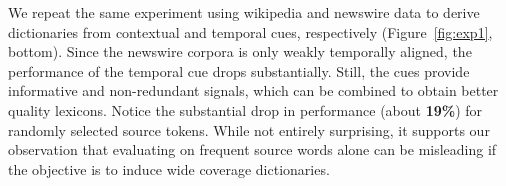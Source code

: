 \documentclass{article}
\newcommand{\figref}[1]{Figure~\ref{#1}}
\begin{document}
We repeat the same experiment using wikipedia and newswire data to derive dictionaries from contextual and temporal cues, respectively (\figref{fig:exp1}, bottom).  Since the newswire corpora is only weakly temporally aligned, the performance of the temporal cue drops substantially.  Still, the cues provide informative and non-redundant signals, which can be combined to obtain better quality lexicons.  Notice the substantial drop in performance (about {\bf 19\%}) for randomly selected source tokens.  While not entirely surprising, it supports our observation that evaluating on frequent source words alone can be misleading if the objective is to induce wide coverage dictionaries.\\

\end{document}
